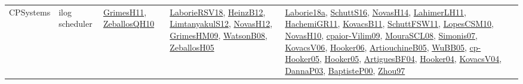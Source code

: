 {\begin{longtable}{llp{6cm}p{6cm}p{6cm}}
CPSystems & ilog scheduler & \href{papers/GrimesH11.pdf}{GrimesH11}\cite{GrimesH11}, \href{articles/ZeballosQH10.pdf}{ZeballosQH10}\cite{ZeballosQH10} & \href{articles/LaborieRSV18.pdf}{LaborieRSV18}\cite{LaborieRSV18}, \href{papers/HeinzB12.pdf}{HeinzB12}\cite{HeinzB12}, \href{articles/LimtanyakulS12.pdf}{LimtanyakulS12}\cite{LimtanyakulS12}, \href{articles/NovasH12.pdf}{NovasH12}\cite{NovasH12}, \href{papers/GrimesHM09.pdf}{GrimesHM09}\cite{GrimesHM09}, \href{papers/WatsonB08.pdf}{WatsonB08}\cite{WatsonB08}, \href{articles/ZeballosH05.pdf}{ZeballosH05}\cite{ZeballosH05} & \href{papers/Laborie18a.pdf}{Laborie18a}\cite{Laborie18a}, \href{papers/SchuttS16.pdf}{SchuttS16}\cite{SchuttS16}, \href{articles/NovasH14.pdf}{NovasH14}\cite{NovasH14}, \href{papers/LahimerLH11.pdf}{LahimerLH11}\cite{LahimerLH11}, \href{articles/HachemiGR11.pdf}{HachemiGR11}\cite{HachemiGR11}, \href{articles/KovacsB11.pdf}{KovacsB11}\cite{KovacsB11}, \href{articles/SchuttFSW11.pdf}{SchuttFSW11}\cite{SchuttFSW11}, \href{articles/LopesCSM10.pdf}{LopesCSM10}\cite{LopesCSM10}, \href{articles/NovasH10.pdf}{NovasH10}\cite{NovasH10}, \href{papers/cpaior-Vilim09.pdf}{cpaior-Vilim09}\cite{cpaior-Vilim09}, \href{papers/MouraSCL08.pdf}{MouraSCL08}\cite{MouraSCL08}, \href{articles/Simonis07.pdf}{Simonis07}\cite{Simonis07}, \href{papers/KovacsV06.pdf}{KovacsV06}\cite{KovacsV06}, \href{articles/Hooker06.pdf}{Hooker06}\cite{Hooker06}, \href{papers/ArtiouchineB05.pdf}{ArtiouchineB05}\cite{ArtiouchineB05}, \href{papers/WuBB05.pdf}{WuBB05}\cite{WuBB05}, \href{papers/cp-Hooker05.pdf}{cp-Hooker05}\cite{cp-Hooker05}, \href{articles/Hooker05.pdf}{Hooker05}\cite{Hooker05}, \href{papers/ArtiguesBF04.pdf}{ArtiguesBF04}\cite{ArtiguesBF04}, \href{papers/Hooker04.pdf}{Hooker04}\cite{Hooker04}, \href{papers/KovacsV04.pdf}{KovacsV04}\cite{KovacsV04}, \href{papers/DannaP03.pdf}{DannaP03}\cite{DannaP03}, \href{articles/BaptisteP00.pdf}{BaptisteP00}\cite{BaptisteP00}, \href{articles/Zhou97.pdf}{Zhou97}\cite{Zhou97}\\

\end{longtable}}
